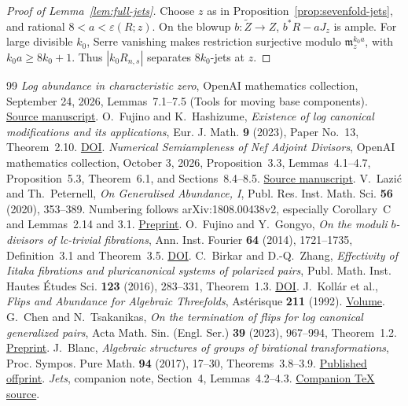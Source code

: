\documentclass[12pt,a4paper,psamsfonts]{amsart}
\theoremstyle{definition}
\theoremstyle{plain}
\begin{document}
\begin{proof}[Proof of Lemma~\ref{lem:full-jets}]
Choose $z$ as in Proposition~\ref{prop:sevenfold-jets}, and rational
$8<a<\varepsilon(R;z)$. On the blowup $b:\widetilde Z\to Z$,
$b^*R-aJ_z$ is ample. For large divisible $k_0$, Serre vanishing
makes restriction surjective modulo $\mathfrak m_z^{k_0a}$,
with $k_0a\ge8k_0+1$. Thus $|k_0R_{n,s}|$ separates $8k_0$-jets at $z$.
\end{proof}

\begin{thebibliography}{99}
\emph{Log abundance in characteristic zero},
OpenAI mathematics collection, September 24, 2026,
Lemmas~7.1--7.5 (Tools for moving base components).
\href{https://github.com/openai/math/blob/main/preprints/Log-abundance-in-characteristic-zero-September-24-2026/paper.pdf}{Source manuscript}.
O.~Fujino and K.~Hashizume,
\emph{Existence of log canonical modifications and its applications},
Eur. J. Math. \textbf{9} (2023), Paper No.~13, Theorem~2.10.
\href{https://doi.org/10.1007/s40879-023-00598-0}{DOI}.
\emph{Numerical Semiampleness of Nef Adjoint Divisors},
OpenAI mathematics collection, October 3, 2026,
Proposition~3.3, Lemmas~4.1--4.7, Proposition~5.3,
Theorem~6.1, and Sections~8.4--8.5.
\href{https://github.com/openai/math/blob/main/preprints/Numerical-Semiampleness-of-Nef-Adjoint-Divisors-October-3-2026/paper.pdf}{Source manuscript}.
V.~Lazi\'c and Th.~Peternell,
\emph{On Generalised Abundance, I},
Publ. Res. Inst. Math. Sci. \textbf{56} (2020), 353--389.
Numbering follows arXiv:1808.00438v2, especially Corollary~C
and Lemmas~2.14 and 3.1.
\href{https://arxiv.org/pdf/1808.00438}{Preprint}.
O.~Fujino and Y.~Gongyo,
\emph{On the moduli $b$-divisors of lc-trivial fibrations},
Ann. Inst. Fourier \textbf{64} (2014), 1721--1735,
Definition~3.1 and Theorem~3.5.
\href{https://doi.org/10.5802/aif.2894}{DOI}.
C.~Birkar and D.-Q.~Zhang,
\emph{Effectivity of Iitaka fibrations and pluricanonical
systems of polarized pairs},
Publ. Math. Inst. Hautes \'Etudes Sci. \textbf{123} (2016),
283--331, Theorem~1.3.
\href{https://doi.org/10.1007/s10240-016-0080-x}{DOI}.
J.~Koll\'ar et al.,
\emph{Flips and Abundance for Algebraic Threefolds},
Ast\'erisque \textbf{211} (1992).
\href{https://www.numdam.org/item/AST_1992__211__1_0/}{Volume}.
G.~Chen and N.~Tsakanikas,
\emph{On the termination of flips for log canonical generalized pairs},
Acta Math. Sin. (Engl. Ser.) \textbf{39} (2023), 967--994,
Theorem~1.2.
\href{https://arxiv.org/pdf/2011.02236}{Preprint}.
J.~Blanc,
\emph{Algebraic structures of groups of birational transformations},
Proc. Sympos. Pure Math. \textbf{94} (2017), 17--30,
Theorems~3.8--3.9.
\href{https://algebra.dmi.unibas.ch/blanc/articles/structurebir.pdf}{Published offprint}.
\emph{Jets}, companion note, Section~4, Lemmas~4.2--4.3.
\href{jets-20261011.tex}{Companion TeX source}.
\end{thebibliography}
\end{document}
